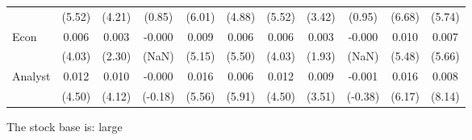 \documentclass[
]{article}
\begin{document}
\begin{table}[H]
{\begin{tabular}{lcccccccccc}
   & (5.52) & (4.21) & (0.85) & (6.01) & (4.88) & (5.52) & (3.42) & (0.95) & (6.68) & (5.74) \\ 
  Econ & 0.006 & 0.003 & -0.000 & 0.009 & 0.006 & 0.006 & 0.003 & -0.000 & 0.010 & 0.007 \\ 
   & (4.03) & (2.30) & (NaN) & (5.15) & (5.50) & (4.03) & (1.93) & (NaN) & (5.48) & (5.66) \\ 
  Analyst & 0.012 & 0.010 & -0.000 & 0.016 & 0.006 & 0.012 & 0.009 & -0.001 & 0.016 & 0.008 \\ 
   & (4.50) & (4.12) & (-0.18) & (5.56) & (5.91) & (4.50) & (3.51) & (-0.38) & (6.17) & (8.14) \\ 
   \hline 
\end{tabular}
}
\end{table}

The stock base is: large
\end{document}
